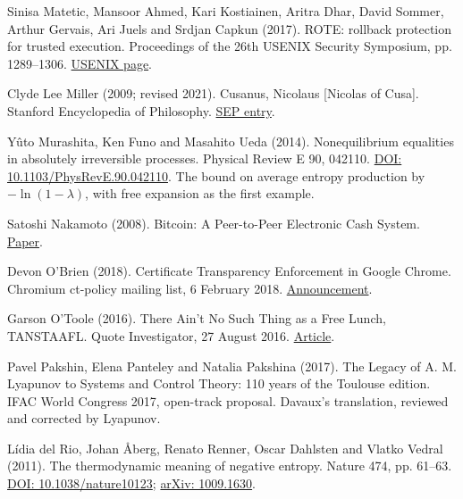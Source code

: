 \documentclass[11pt,twoside]{article}
\theoremstyle{thielethm}
\theoremstyle{thieledef}
\theoremstyle{thieledef}
\theoremstyle{thieledef}
\theoremstyle{thielethm}
\theoremstyle{thieleobs}
\theoremstyle{thielethm}
\begin{document}
\noindent Sinisa Matetic, Mansoor Ahmed, Kari Kostiainen, Aritra Dhar, David Sommer, Arthur Gervais, Ari Juels and Srdjan Capkun (2017). ROTE: rollback protection for trusted execution. Proceedings of the 26th USENIX Security Symposium, pp. 1289--1306. \href{https://www.usenix.org/conference/usenixsecurity17/technical-sessions/presentation/matetic}{USENIX page}.
\par\medskip

\noindent Clyde Lee Miller (2009; revised 2021). Cusanus, Nicolaus [Nicolas of Cusa]. Stanford Encyclopedia of Philosophy. \href{https://plato.stanford.edu/entries/cusanus/}{SEP entry}.
\par\medskip

\noindent Y\^uto Murashita, Ken Funo and Masahito Ueda (2014). Nonequilibrium equalities in absolutely irreversible processes. Physical Review E 90, 042110. \href{https://doi.org/10.1103/PhysRevE.90.042110}{DOI: 10.1103/PhysRevE.90.042110}. The bound on average entropy production by $-\ln(1-\lambda)$, with free expansion as the first example.
\par\medskip

\noindent Satoshi Nakamoto (2008). Bitcoin: A Peer-to-Peer Electronic Cash System. \href{https://bitcoin.org/bitcoin.pdf}{Paper}.
\par\medskip

\noindent Devon O'Brien (2018). Certificate Transparency Enforcement in Google Chrome. Chromium ct-policy mailing list, 6 February 2018. \href{https://groups.google.com/a/chromium.org/g/ct-policy/c/wHILiYf31DE/m/iMFmpMEkAQAJ}{Announcement}.
\par\medskip

\noindent Garson O'Toole (2016). There Ain't No Such Thing as a Free Lunch, TANSTAAFL. Quote Investigator, 27 August 2016. \href{https://quoteinvestigator.com/2016/08/27/free-lunch/}{Article}.
\par\medskip

\noindent Pavel Pakshin, Elena Panteley and Natalia Pakshina (2017). The Legacy of A. M. Lyapunov to Systems and Control Theory: 110 years of the Toulouse edition. IFAC World Congress 2017, open-track proposal. Davaux's translation, reviewed and corrected by Lyapunov.
\par\medskip

\noindent Lídia del Rio, Johan Åberg, Renato Renner, Oscar Dahlsten and Vlatko Vedral (2011). The thermodynamic meaning of negative entropy. Nature 474, pp. 61--63. \href{https://doi.org/10.1038/nature10123}{DOI: 10.1038/nature10123}; \href{https://arxiv.org/abs/1009.1630}{arXiv: 1009.1630}.
\par\medskip
\end{document}
